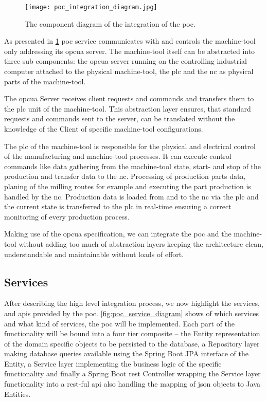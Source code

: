 \documentclass[
a4paper,
twoside,
headsepline,
cleardoublepage=empty,
parskip=half,
draft=false
]{scrbook}
\begin{document}
				\begin{figure}[htbp]
					\centering
					\texttt{[image: poc\_integration\_diagram.jpg]}
					\caption{The component diagram of the integration of the \gls{poc}.}
					\label{fig:poc_integration_diagram}
				\end{figure}

				As presented in \cref{fig:poc_integration_diagram} \gls{poc} service communicates with and controls the machine-tool only addressing its \gls{opcua} server. The machine-tool itself can be abstracted into three sub components: the \gls{opcua} server running on the controlling industrial computer attached to the physical machine-tool, the \gls{plc} and the \gls{nc} as physical parts of the machine-tool.

				The \gls{opcua} Server receives client requests and commands and transfers them to the \gls{plc} unit of the machine-tool. This abstraction layer ensures, that standard requests and commands sent to the server, can be translated without the knowledge of the Client of specific machine-tool configurations.

				The \gls{plc} of the machine-tool is responsible for the physical and electrical control of the manufacturing and machine-tool processes. It can execute control commands like data gathering from the machine-tool state, start- and stop of the production and transfer data to the \gls{nc}. Processing of production parts data, planing of the milling routes for example and executing the part production is handled by the \gls{nc}. Production data is loaded from and to the \gls{nc} via the \gls{plc} and the current state is transferred to the \gls{plc} in real-time ensuring a correct monitoring of every production process.

				Making use of the \gls{opcua} specification, we can integrate the \gls{poc} and the machine-tool without adding too much of abstraction layers keeping the architecture clean, understandable and maintainable without loads of effort.

			\subsection{Services} \label{subsec:services}

				After describing the high level integration process, we now highlight the services, and \gls{api}s provided by the \gls{poc}. \cref{fig:poc_service_diagram} shows of which services and what kind of services, the \gls{poc} will be implemented. Each part of the functionality will be bound into a four tier composite -- the Entity representation of the domain specific objects to be persisted to the database, a Repository layer making database queries available using the Spring Boot JPA interface of the Entity, a Service layer implementing the business logic of the specific functionality and finally a Spring Boot \gls{rest} Controller wrapping the Service layer functionality into a \gls{rest}-ful \gls{api} also handling the mapping of \gls{json} objects to Java Entities.
\end{document}

